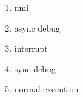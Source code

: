 \begin{enumerate}
    \item nmi
    \item async debug
    \item interrupt
    \item sync debug
    \item normal execution
\end{enumerate}


%
%
%
%
%
%
%
%
%
%
%
%
%


%
%


